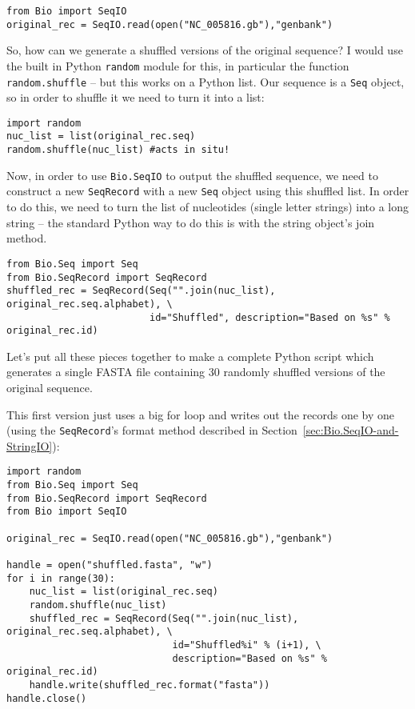 \documentclass{report}
\begin{document}
\begin{verbatim}
from Bio import SeqIO
original_rec = SeqIO.read(open("NC_005816.gb"),"genbank")
\end{verbatim}

So, how can we generate a shuffled versions of the original sequence?  I would
use the built in Python \verb|random| module for this, in particular the function
\verb|random.shuffle| -- but this works on a Python list.  Our sequence is a
\verb|Seq| object, so in order to shuffle it we need to turn it into a list:

\begin{verbatim}
import random
nuc_list = list(original_rec.seq)
random.shuffle(nuc_list) #acts in situ!
\end{verbatim}

Now, in order to use \verb|Bio.SeqIO| to output the shuffled sequence, we need
to construct a new \verb|SeqRecord| with a new \verb|Seq| object using this
shuffled list.  In order to do this, we need to turn the list of nucleotides
(single letter strings) into a long string -- the standard Python way to do
this is with the string object's join method.

\begin{verbatim}
from Bio.Seq import Seq
from Bio.SeqRecord import SeqRecord
shuffled_rec = SeqRecord(Seq("".join(nuc_list), original_rec.seq.alphabet), \
                         id="Shuffled", description="Based on %s" % original_rec.id)
\end{verbatim}

Let's put all these pieces together to make a complete Python script which
generates a single FASTA file containing 30 randomly shuffled versions of
the original sequence.

This first version just uses a big for loop and writes out the records one by one
(using the \verb|SeqRecord|'s format method described in
Section~\ref{sec:Bio.SeqIO-and-StringIO}):

\begin{verbatim}
import random
from Bio.Seq import Seq
from Bio.SeqRecord import SeqRecord
from Bio import SeqIO

original_rec = SeqIO.read(open("NC_005816.gb"),"genbank")

handle = open("shuffled.fasta", "w")
for i in range(30):
    nuc_list = list(original_rec.seq)
    random.shuffle(nuc_list)
    shuffled_rec = SeqRecord(Seq("".join(nuc_list), original_rec.seq.alphabet), \
                             id="Shuffled%i" % (i+1), \
                             description="Based on %s" % original_rec.id)
    handle.write(shuffled_rec.format("fasta"))
handle.close()
\end{verbatim}
\end{document}
